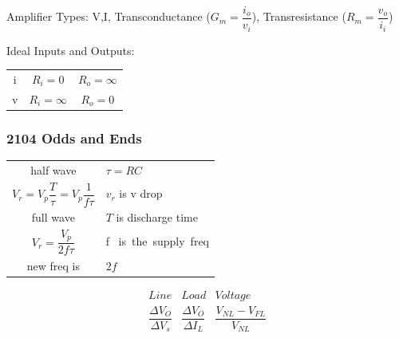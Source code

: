 \documentclass[a4paper,12pt]{article}
\begin{document}
\begin{multicols}{2}
Amplifier Types: V,I, Transconductance ($G_m=\dfrac{i_o}{v_i}$),
Transresistance ($R_m=\dfrac{v_o}{i_i}$)

Ideal Inputs and Outputs: 
\begin{tabular}{ccc}
i&$R_i=0$&$R_o=\infty$\\
v&$R_i=\infty$&$R_o=0$\\
\end{tabular}
\subsubsection*{2104 Odds and Ends}

\begin{tabular}{cl}
half wave&$\tau= RC$\\
$V_r = V_p \dfrac{T}{\tau} = V_p\dfrac{1}{f\tau }$&$v_r$ is v drop\\
full wave&$T$ is discharge time\\
$V_r = \dfrac{V_p}{2f\tau }$&f \mbox{ is the supply freq}\\
new freq is&$2f$\\
\end{tabular}

\vfill

\[
\begin{array}{ccc}
Line    &   Load    &   Voltage\\
\dfrac{\Delta V_O}{ \Delta V_s} &\dfrac{\Delta V_O }{\Delta I_L }&\dfrac{V_{NL}
- V_{FL}}{V_{NL}}\\


\end{array}\]
\end{multicols}
\end{document}
